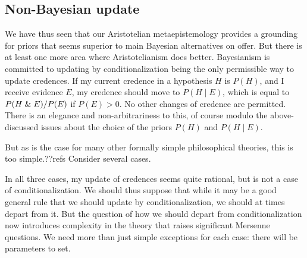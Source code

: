 \subsection{Non-Bayesian update}
We have thus seen that our Aristotelian metaepistemology provides a grounding for priors that seems superior to main
Bayesian alternatives on offer. But there is at least one more area where Aristotelianism does better. 
Bayesianism is committed to updating by conditionalization being the only permissible way to update credences. 
If my current credence in a hypothesis $H$ is $P(H)$, and I receive evidence $E$, my credence should move 
to $P(H\mid E)$, which is equal to $P(H\mathrel{\&} E)/P(E)$ if $P(E)>0$. No other changes of credence are permitted. There is an elegance and non-arbitrariness to this,
of course modulo the above-discussed issues about the choice of the priors $P(H)$ and $P(H\mid E)$.

But as is the case for many other formally simple philosophical theories, this is too
simple.??refs Consider several cases. 




In all three cases, my update of credences seems quite rational, but is not a case of conditionalization. We should thus
suppose that while it may be a good general rule that we should update by conditionalization, we should at times depart from it.
But the question of how we should depart from conditionalization now introduces complexity in the theory that raises significant
Mersenne questions. We need more than just simple exceptions for each case: there will be parameters to set.

